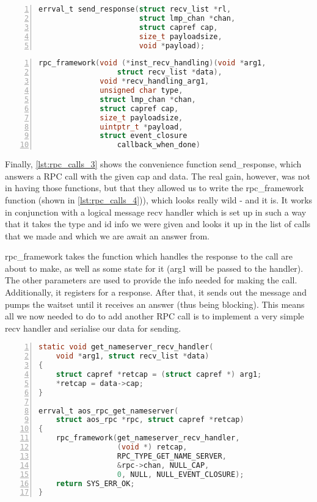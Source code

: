 \begin{lstlisting}[caption={RPC send\_response prototype}, 
label=lst:rpc_calls_3, numbers=left, stepnumber=1, float, floatplacement=tl, 
frame=tb, language=c]
errval_t send_response(struct recv_list *rl, 
                       struct lmp_chan *chan,
                       struct capref cap, 
                       size_t payloadsize, 
                       void *payload);
\end{lstlisting}
\begin{lstlisting}[caption={rpc\_framework prototype}, 
label=lst:rpc_calls_4, numbers=left, stepnumber=1, float, floatplacement=tl, 
frame=tb, language=c]
rpc_framework(void (*inst_recv_handling)(void *arg1, 
                  struct recv_list *data),
              void *recv_handling_arg1,
              unsigned char type,
              struct lmp_chan *chan, 
              struct capref cap, 
              size_t payloadsize, 
              uintptr_t *payload,
              struct event_closure 
                  callback_when_done)
\end{lstlisting}

Finally, \autoref{lst:rpc_calls_3} shows the convenience function 
send\_response, which answers a RPC call with the given cap and data. 
The real gain, however, was not in having those functions, but that they 
allowed us to write the rpc\_framework function (shown in 
\autoref{lst:rpc_calls_4})), which looks really wild - and it is. 
It works in conjunction with a logical message recv handler 
which is set up in such a way that it takes the type and id info we were given 
and looks it up in the list of calls that we made and which we are await an 
answer from.
\medskip

rpc\_framework takes 
the function which handles the response to the call are about to make, as 
well as some state for it (arg1 will be passed to the handler). 
The other parameters are used to provide the info needed for making the call.
Additionally, it registers for a response. After that, it sends out the message and 
pumps the waitset until it receives an answer (thus being blocking). 
This means all we now needed to do to add another RPC call is to implement a 
very simple recv handler and 
serialise our data for sending.
\medskip

\begin{lstlisting}[caption={aos\_rpc\_get with helper function}, 
label=lst:rpc_example, numbers=left, stepnumber=1, float, floatplacement=tl, 
frame=tb, language=c]
static void get_nameserver_recv_handler(
    void *arg1, struct recv_list *data)
{
    struct capref *retcap = (struct capref *) arg1;
    *retcap = data->cap;
}

errval_t aos_rpc_get_nameserver(
    struct aos_rpc *rpc, struct capref *retcap)
{
    rpc_framework(get_nameserver_recv_handler,
                  (void *) retcap,
                  RPC_TYPE_GET_NAME_SERVER, 
                  &rpc->chan, NULL_CAP,
                  0, NULL, NULL_EVENT_CLOSURE);
    return SYS_ERR_OK;
}
\end{lstlisting}

